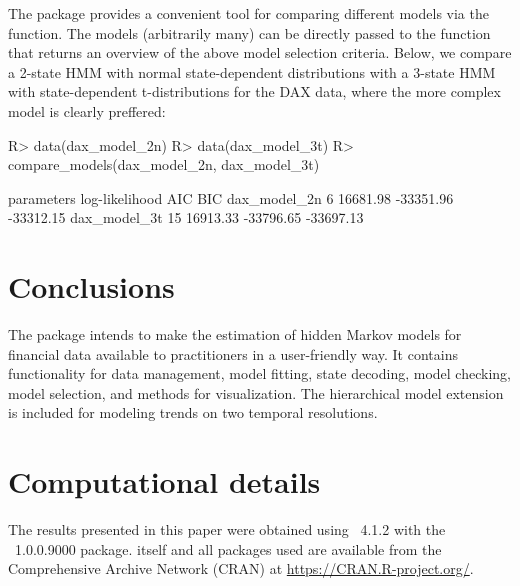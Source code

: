 \documentclass[article]{jss}
\newcommand{\fct}[1]{\code{#1()}}
\begin{document}
The  package provides a convenient tool for comparing different models via the \fct{compare\_models} function. The models (arbitrarily many) can be directly passed to the \fct{compare\_models} function that returns an overview of the above model selection criteria. Below, we compare a 2-state HMM with normal state-dependent distributions with a 3-state HMM with state-dependent t-distributions for the DAX data, where the more complex model is clearly preffered:

%
\begin{Schunk}
\begin{Sinput}
R> data(dax_model_2n)
R> data(dax_model_3t)
R> compare_models(dax_model_2n, dax_model_3t)
\end{Sinput}
\begin{Soutput}
             parameters log-likelihood       AIC       BIC
dax_model_2n          6       16681.98 -33351.96 -33312.15
dax_model_3t         15       16913.33 -33796.65 -33697.13
\end{Soutput}
\end{Schunk}
%



\section{Conclusions} \label{sec:conclusion} %

The  package intends to make the estimation of hidden Markov models for financial data available to practitioners in a user-friendly way. It contains functionality for data management, model fitting, state decoding, model checking, model selection, and methods for visualization. The hierarchical model extension is included for modeling trends on two temporal resolutions. 



\section*{Computational details}

The results presented in this paper were obtained using
~4.1.2 with the
~1.0.0.9000 package.  itself
and all packages used are available from the Comprehensive
 Archive Network (CRAN) at \url{https://CRAN.R-project.org/}.
\end{document}
